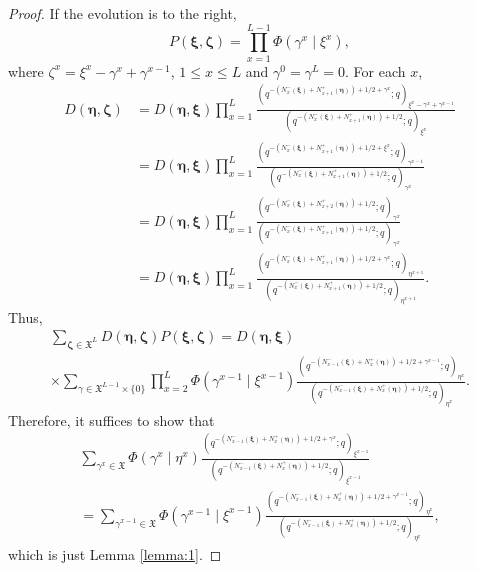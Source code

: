 \documentclass{ximera}
\begin{document}
\begin{proof}
If the evolution is to the right, 
\begin{equation*}
    P(\boldsymbol\xi,\boldsymbol\zeta)=\prod_{x=1}^{L-1}\Phi(\gamma^x\mid\xi^x),
\end{equation*}
where $\zeta^x=\xi^x-\gamma^x+\gamma^{x-1}$, $1\le x\le L$ and $\gamma^0=\gamma^{L}=0$.
For each $x$,
\begin{equation*}
\begin{array}{cl}
    D (\boldsymbol\eta,\boldsymbol\zeta) &   =D(\boldsymbol\eta,\boldsymbol\xi)\prod_{x=1}^L\frac{\left(q^{-\left(N_{x}^-(\boldsymbol\xi)+N_{x+1}^+(\boldsymbol\eta)\right)+1/2+\gamma^x};q\right)_{\xi^{x}-\gamma^x+\gamma^{x-1}}}{\left(q^{-\left(N_{x}^-(\boldsymbol\xi)+N_{x+1}^+(\boldsymbol\eta)\right)+1/2};q\right)_{\xi^{x}}}\\ 
     &  =D(\boldsymbol\eta,\boldsymbol\xi)\prod_{x=1}^L\frac{\left(q^{-\left(N_{x}^-(\boldsymbol\xi)+N_{x+1}^+(\boldsymbol\eta)\right)+1/2+\xi^x};q\right)_{\gamma^{x-1}}}{\left(q^{-\left(N_{x}^-(\boldsymbol\xi)+N_{x+1}^+(\boldsymbol\eta)\right)+1/2};q\right)_{\gamma^x}}\\
     & =D(\boldsymbol\eta,\boldsymbol\xi)\prod_{x=1}^L\frac{\left(q^{-\left(N_{x}^-(\boldsymbol\xi)+N_{x+2}^+(\boldsymbol\eta)\right)+1/2};q\right)_{\gamma^{x}}}{\left(q^{-\left(N_{x}^-(\boldsymbol\xi)+N_{x+1}^+(\boldsymbol\eta)\right)+1/2};q\right)_{\gamma^x}}\\
     & 
     =D(\boldsymbol\eta,\boldsymbol\xi)\prod_{x=1}^L\frac{\left(q^{-\left(N_{x}^-(\boldsymbol\xi)+N_{x+1}^+(\boldsymbol\eta)\right)+1/2+\gamma^x};q\right)_{\eta^{x+1}}}{\left(q^{-\left(N_{x}^-(\boldsymbol\xi)+N_{x+1}^+(\boldsymbol\eta)\right)+1/2};q\right)_{\eta^{x+1}}}.
\end{array}
\end{equation*}
Thus,
\begin{multline*}
     \sum_{\boldsymbol\zeta\in\mathfrak{X}^L}D(\boldsymbol\eta,\boldsymbol\zeta)P(\boldsymbol\xi,\boldsymbol\zeta)=D(\boldsymbol\eta,\boldsymbol\xi)\\\times\sum_{\gamma\in  \mathfrak{X}^{L-1}\times\{0\} }\prod_{x=2}^{L}\Phi(\gamma^{x-1}\mid\xi^{x-1})\frac{\left(q^{-\left(N_{x-1}^-(\boldsymbol\xi)+N_{x}^+(\boldsymbol\eta)\right)+1/2+\gamma^{x-1}};q\right)_{\eta^{x}}}{\left(q^{-\left(N_{x-1}^-(\boldsymbol\xi)+N_{x}^+(\boldsymbol\eta)\right)+1/2};q\right)_{\eta^{x}}}.
\end{multline*}
Therefore, it suffices to show that
\begin{multline*}
    \sum_{\gamma^x\in  \mathfrak{X} }\Phi(\gamma^x\mid\eta^x) \frac{\left(q^{-\left(N_{x-1}^-(\boldsymbol\xi)+N_{x}^+(\boldsymbol\eta)\right)+1/2+\gamma^{x}};q\right)_{\xi^{x-1}}}{\left(q^{-\left(N_{x-1}^-(\boldsymbol\xi)+N_{x}^+(\boldsymbol\eta)\right)+1/2};q\right)_{\xi^{x-1}}} \\=\sum_{\gamma^{x-1}\in  \mathfrak{X} }\Phi(\gamma^{x-1}\mid\xi^{x-1})\frac{\left(q^{-\left(N_{x-1}^-(\boldsymbol\xi)+N_{x}^+(\boldsymbol\eta)\right)+1/2+\gamma^{x-1}};q\right)_{\eta^{x}}}{\left(q^{-\left(N_{x-1}^-(\boldsymbol\xi)+N_{x}^+(\boldsymbol\eta)\right)+1/2};q\right)_{\eta^{x}}},
\end{multline*}
which is just Lemma \ref{lemma:1}.
\end{proof}
\end{document}

